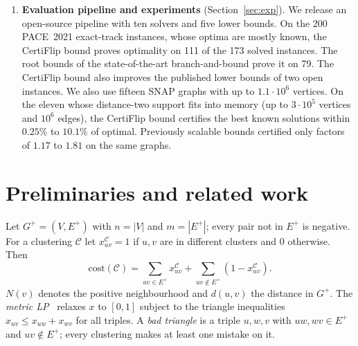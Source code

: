 \documentclass[11pt]{article}
\theoremstyle{definition}
\newcommand{\cost}{\mathrm{cost}}
\newcommand{\Ep}{E^{+}}
\begin{document}
\begin{enumerate}
\item \textbf{Evaluation pipeline and experiments} (Section~\ref{sec:exp}).
We release an open-source pipeline with ten solvers and five lower bounds.
On the 200 PACE~2021 exact-track instances, whose optima are mostly known, the
CertiFlip bound proves optimality on 111 of the 173 solved instances.  The
root bounds of the state-of-the-art branch-and-bound prove it on 79.  The
CertiFlip bound also improves the published lower bounds of two open
instances.  We also use fifteen SNAP graphs with up to $1.1\cdot 10^6$ vertices.  On the
eleven whose distance-two support fits into memory (up to $3\cdot10^5$
vertices and $10^6$ edges), the CertiFlip bound certifies the best known
solutions within $0.25\%$ to $10.1\%$ of optimal.  Previously scalable bounds
certified only factors of $1.17$ to $1.81$ on the same graphs.
\end{enumerate}

\section{Preliminaries and related work}\label{sec:prelim}

Let $G^+=(V,\Ep)$ with $n=|V|$ and $m=|\Ep|$; every pair not in $\Ep$ is
negative.  For a clustering $\mathcal{C}$ let $x^{\mathcal C}_{uv}=1$ if $u,v$
are in different clusters and $0$ otherwise.  Then
\[
\cost(\mathcal C)=\sum_{uv\in\Ep}x^{\mathcal C}_{uv}+\sum_{uv\notin\Ep}(1-x^{\mathcal C}_{uv}).
\]
$N(v)$ denotes the positive neighbourhood and $d(u,v)$ the distance in $G^+$.
The \emph{metric LP}~\citep{CharikarGW05,AilonCN08} relaxes $x$ to $[0,1]$
subject to the triangle inequalities $x_{uv}\le x_{uw}+x_{wv}$ for all
triples.  A \emph{bad triangle} is a triple $u,w,v$ with $uw,wv\in\Ep$ and
$uv\notin\Ep$; every clustering makes at least one mistake on it.
\end{document}
